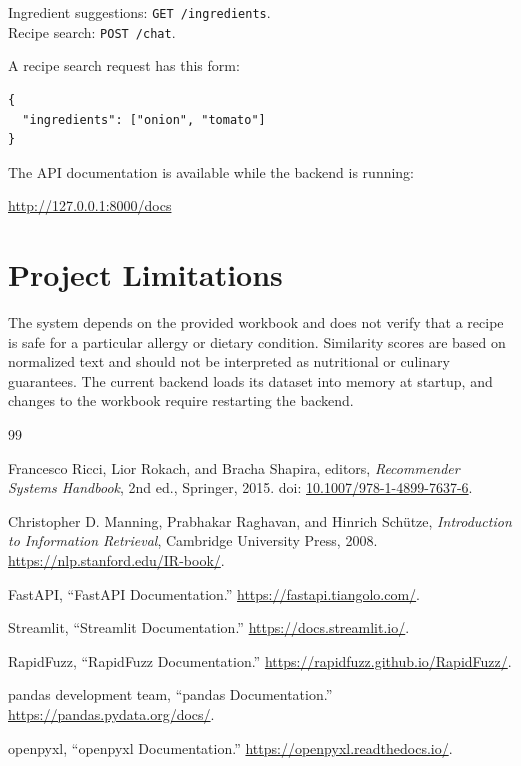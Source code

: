 \documentclass[12pt,a4paper]{report}
\begin{document}
\noindent Ingredient suggestions: \texttt{GET /ingredients}.\\
Recipe search: \texttt{POST /chat}.

A recipe search request has this form:

\begin{verbatim}
{
  "ingredients": ["onion", "tomato"]
}
\end{verbatim}

The API documentation is available while the backend is running:

\begin{center}
\url{http://127.0.0.1:8000/docs}
\end{center}

\section{Project Limitations}
\label{app:limitations}

The system depends on the provided workbook and does not verify that a recipe is safe for a particular allergy or dietary condition. Similarity scores are based on normalized text and should not be interpreted as nutritional or culinary guarantees. The current backend loads its dataset into memory at startup, and changes to the workbook require restarting the backend.

\clearpage
\raggedright
\begin{thebibliography}{99}

 Francesco Ricci, Lior Rokach, and Bracha Shapira, editors, \textit{Recommender Systems Handbook}, 2nd ed., Springer, 2015. doi: \href{https://doi.org/10.1007/978-1-4899-7637-6}{10.1007/978-1-4899-7637-6}.

 Christopher D. Manning, Prabhakar Raghavan, and Hinrich Sch\"utze, \textit{Introduction to Information Retrieval}, Cambridge University Press, 2008. \url{https://nlp.stanford.edu/IR-book/}.

 FastAPI, ``FastAPI Documentation.'' \url{https://fastapi.tiangolo.com/}.

 Streamlit, ``Streamlit Documentation.'' \url{https://docs.streamlit.io/}.

 RapidFuzz, ``RapidFuzz Documentation.'' \url{https://rapidfuzz.github.io/RapidFuzz/}.

 pandas development team, ``pandas Documentation.'' \url{https://pandas.pydata.org/docs/}.

 openpyxl, ``openpyxl Documentation.'' \url{https://openpyxl.readthedocs.io/}.

\end{thebibliography}
\end{document}
